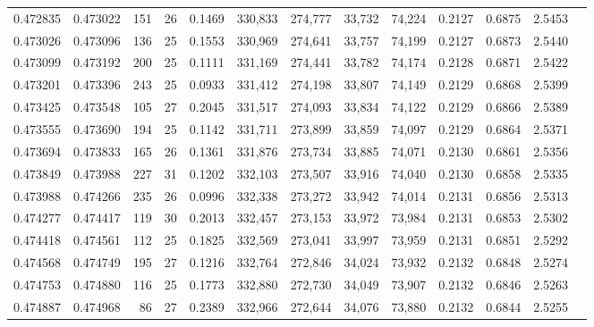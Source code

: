 \begin{tabular}{rrrrrrrrrrrrr}
0.472835 & 0.473022 &   151 &  26 &                                     0.1469 & 330,833 & 274,777 &  33,732 &  74,224 & 0.2127 & 0.6875 & 2.5453 \\
0.473026 & 0.473096 &   136 &  25 &                                     0.1553 & 330,969 & 274,641 &  33,757 &  74,199 & 0.2127 & 0.6873 & 2.5440 \\
0.473099 & 0.473192 &   200 &  25 &                                     0.1111 & 331,169 & 274,441 &  33,782 &  74,174 & 0.2128 & 0.6871 & 2.5422 \\
0.473201 & 0.473396 &   243 &  25 &                                     0.0933 & 331,412 & 274,198 &  33,807 &  74,149 & 0.2129 & 0.6868 & 2.5399 \\
0.473425 & 0.473548 &   105 &  27 &                                     0.2045 & 331,517 & 274,093 &  33,834 &  74,122 & 0.2129 & 0.6866 & 2.5389 \\
0.473555 & 0.473690 &   194 &  25 &                                     0.1142 & 331,711 & 273,899 &  33,859 &  74,097 & 0.2129 & 0.6864 & 2.5371 \\
0.473694 & 0.473833 &   165 &  26 &                                     0.1361 & 331,876 & 273,734 &  33,885 &  74,071 & 0.2130 & 0.6861 & 2.5356 \\
0.473849 & 0.473988 &   227 &  31 &                                     0.1202 & 332,103 & 273,507 &  33,916 &  74,040 & 0.2130 & 0.6858 & 2.5335 \\
0.473988 & 0.474266 &   235 &  26 &                                     0.0996 & 332,338 & 273,272 &  33,942 &  74,014 & 0.2131 & 0.6856 & 2.5313 \\
0.474277 & 0.474417 &   119 &  30 &                                     0.2013 & 332,457 & 273,153 &  33,972 &  73,984 & 0.2131 & 0.6853 & 2.5302 \\
0.474418 & 0.474561 &   112 &  25 &                                     0.1825 & 332,569 & 273,041 &  33,997 &  73,959 & 0.2131 & 0.6851 & 2.5292 \\
0.474568 & 0.474749 &   195 &  27 &                                     0.1216 & 332,764 & 272,846 &  34,024 &  73,932 & 0.2132 & 0.6848 & 2.5274 \\
0.474753 & 0.474880 &   116 &  25 &                                     0.1773 & 332,880 & 272,730 &  34,049 &  73,907 & 0.2132 & 0.6846 & 2.5263 \\
0.474887 & 0.474968 &    86 &  27 &                                     0.2389 & 332,966 & 272,644 &  34,076 &  73,880 & 0.2132 & 0.6844 & 2.5255 \\

\end{tabular}
